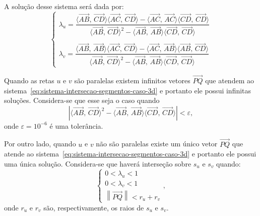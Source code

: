 A solução desse sistema será dada por:
\begin{equation}
  \begin{cases}
    \lambda_u = \dfrac{\langle \overrightarrow{AB}, \, \overrightarrow{CD}\rangle \langle \overrightarrow{AC}, \, \overrightarrow{CD}\rangle - \langle \overrightarrow{AC}, \, \overrightarrow{AC}\rangle \langle \overrightarrow{CD}, \, \overrightarrow{CD}\rangle}{\langle \overrightarrow{AB}, \, \overrightarrow{CD}\rangle ^2 - \langle \overrightarrow{AB}, \, \overrightarrow{AB}\rangle \langle \overrightarrow{CD}, \, \overrightarrow{CD}\rangle}\\ \\
    \lambda_v = \dfrac{\langle \overrightarrow{AB}, \, \overrightarrow{AB}\rangle \langle \overrightarrow{AC}, \, \overrightarrow{CD}\rangle - \langle \overrightarrow{AC}, \, \overrightarrow{AB}\rangle \langle \overrightarrow{AB}, \, \overrightarrow{CD}\rangle}{\langle \overrightarrow{AB}, \, \overrightarrow{CD}\rangle ^2 - \langle \overrightarrow{AB}, \, \overrightarrow{AB}\rangle \langle \overrightarrow{CD}, \, \overrightarrow{CD}\rangle}
  \end{cases}
  \label{eq:solucao-sistema-intersecao-segmentos-caso-3d}
\end{equation}

Quando as retas $u$ e $v$ são paralelas existem infinitos vetores $\overrightarrow{PQ}$ 
que atendem ao sistema~\eqref{eq:sistema-intersecao-segmentos-caso-3d} e portanto ele
possui infinitas soluções. Considera-se que esse seja o caso quando
\begin{equation}
  \left|\langle \overrightarrow{AB}, \, \overrightarrow{CD}\rangle ^2 - \langle \overrightarrow{AB}, \, \overrightarrow{AB}\rangle \langle \overrightarrow{CD}, \, \overrightarrow{CD}\rangle\right| < \varepsilon,
  \label{eq:solucao-tolerancia-sistema-intersecao-segmentos-caso-3d}
\end{equation}
onde $\varepsilon = 10^{-6}$ é uma tolerância.

Por outro lado, quando $u$ e $v$ não são paralelas existe um único vetor $\overrightarrow{PQ}$ 
que atende ao sistema~\eqref{eq:sistema-intersecao-segmentos-caso-3d} e portanto ele
possui uma única solução. Considera-se que haverá interseção sobre $s_u$ e $s_v$ quando: 
\begin{equation}
  \begin{cases}
    0 < \lambda_u < 1 \\
    0 < \lambda_v < 1 \\
	\left\|\overrightarrow{PQ}\right\| < r_u + r_v
  \end{cases},
  \label{eq:solucao-tolerancia-intersecao-segmentos-caso-3d}
\end{equation}
onde $r_u$ e $r_v$ são, respectivamente, os raios de $s_u$ e $s_v$.

